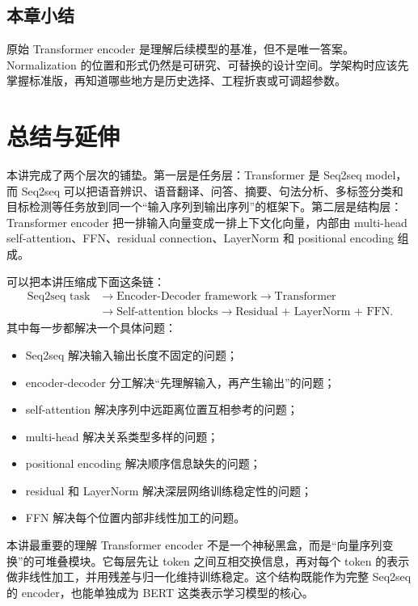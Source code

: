 \documentclass[a4paper]{article}
\begin{document}
\subsection{本章小结}

原始 Transformer encoder 是理解后续模型的基准，但不是唯一答案。Normalization 的位置和形式仍然是可研究、可替换的设计空间。学架构时应该先掌握标准版，再知道哪些地方是历史选择、工程折衷或可调超参数。

\section{总结与延伸}

本讲完成了两个层次的铺垫。第一层是任务层：Transformer 是 Seq2seq model，而 Seq2seq 可以把语音辨识、语音翻译、问答、摘要、句法分析、多标签分类和目标检测等任务放到同一个“输入序列到输出序列”的框架下。第二层是结构层：Transformer encoder 把一排输入向量变成一排上下文化向量，内部由 multi-head self-attention、FFN、residual connection、LayerNorm 和 positional encoding 组成。

可以把本讲压缩成下面这条链：
\[
\begin{aligned}
    \text{Seq2seq task}
    &\rightarrow
    \text{Encoder-Decoder framework}
    \rightarrow
    \text{Transformer}\\
    &\rightarrow
    \text{Self-attention blocks}
    \rightarrow
    \text{Residual + LayerNorm + FFN}.
\end{aligned}
\]
其中每一步都解决一个具体问题：
\begin{itemize}
    \item Seq2seq 解决输入输出长度不固定的问题；
    \item encoder-decoder 分工解决“先理解输入，再产生输出”的问题；
    \item self-attention 解决序列中远距离位置互相参考的问题；
    \item multi-head 解决关系类型多样的问题；
    \item positional encoding 解决顺序信息缺失的问题；
    \item residual 和 LayerNorm 解决深层网络训练稳定性的问题；
    \item FFN 解决每个位置内部非线性加工的问题。
\end{itemize}

\begin{importantbox}{本讲最重要的理解}
    Transformer encoder 不是一个神秘黑盒，而是“向量序列变换”的可堆叠模块。它每层先让 token 之间互相交换信息，再对每个 token 的表示做非线性加工，并用残差与归一化维持训练稳定。这个结构既能作为完整 Seq2seq 的 encoder，也能单独成为 BERT 这类表示学习模型的核心。
\end{importantbox}
\end{document}
